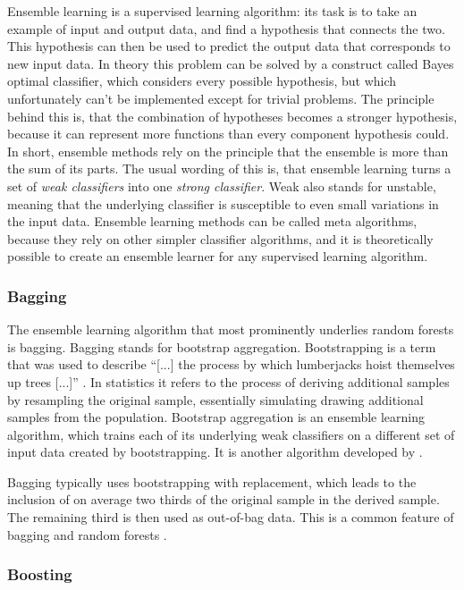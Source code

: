 \documentclass[a4paper,man,12pt,apacite,floatsintext,draftfirst]{apa6} %
\begin{document}
Ensemble learning is a supervised learning algorithm: its task is to take
an example of input and output data, and find a hypothesis that connects
the two.
This hypothesis can then be used to predict the output data that
corresponds to new input data.
In theory this problem can be solved by a construct called
Bayes optimal classifier, which considers every possible hypothesis,
but which unfortunately can't be implemented except for trivial problems.
The principle behind this is, that the combination of hypotheses becomes
a stronger hypothesis, because it can represent more functions
than every component hypothesis could.
In short, ensemble methods rely on the principle that the ensemble is more
than the sum of its parts.
The usual wording of this is, that ensemble learning turns a set of
\emph{weak classifiers} into one \emph{strong classifier}.
Weak also stands for unstable, meaning that the underlying classifier is
susceptible to even small variations in the input data.
Ensemble learning methods can be called meta algorithms,
because they rely on other simpler classifier algorithms,
and it is theoretically possible to create an ensemble learner for any
supervised learning algorithm. \cite{wpEL, Polikar:2009}

\subsubsection{Bagging}

The ensemble learning algorithm that most prominently underlies
random forests is bagging. Bagging stands for bootstrap aggregation.
Bootstrapping is a term that was used to describe
“[...] the process by which lumberjacks hoist themselves up trees [...]”
\cite{wpBOOT}.
In statistics it refers to the process of deriving additional samples
by resampling the original sample,
essentially simulating drawing additional samples from the population.
Bootstrap aggregation is an ensemble learning algorithm,
which trains each of its underlying weak classifiers on a different set
of input data created by bootstrapping.
It is another algorithm developed by .

Bagging typically uses bootstrapping with replacement,
which leads to the inclusion of on average two thirds of the original sample
in the derived sample.
The remaining third is then used as out-of-bag data.
This is a common feature of bagging and random forests \cite{breiman2001random}.

\subsubsection{Boosting}
\end{document}
